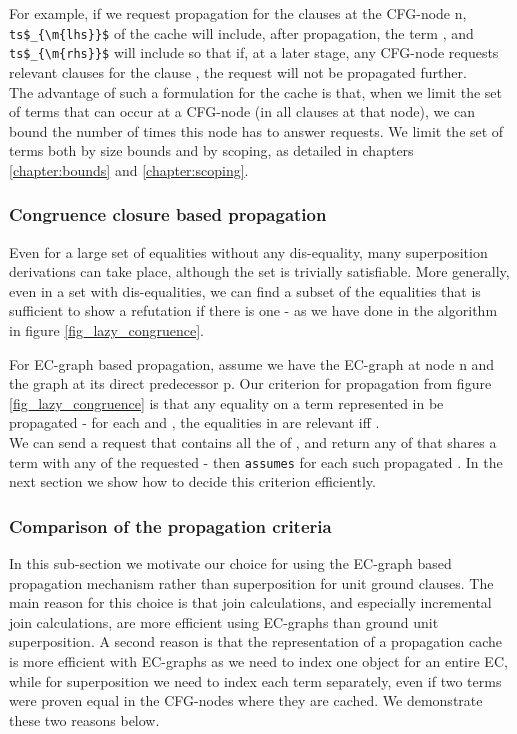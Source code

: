 For example, if we request propagation for the clauses  at the CFG-node n, \lstinline|ts$_{\m{lhs}}$| of the cache will include, after propagation, the term , and \lstinline|ts$_{\m{rhs}}$| will include  so that if, at a later stage, any CFG-node requests relevant clauses for the clause , the request will not be propagated further.\\
The advantage of such a formulation for the cache is that, when we limit the set of terms that can occur at a CFG-node (in all clauses at that node), we can bound the number of times this node has to answer requests. We limit the set of terms both by size bounds and by scoping, as detailed in chapters \ref{chapter:bounds} and \ref{chapter:scoping}.

\subsubsection*{Congruence closure based propagation}
Even for a large set of equalities without any dis-equality,
many superposition derivations can take place, although the set is trivially satisfiable.
More generally, even in a set with dis-equalities, we can find a subset of the equalities that is sufficient to show a refutation if there is one - as we have done in the algorithm in figure \ref{fig_lazy_congruence}.

\bigskip

\noindent
For EC-graph based propagation, assume we have the EC-graph  at node n and the graph  at its direct predecessor p.
Our criterion for propagation from figure \ref{fig_lazy_congruence} is that any equality on a term represented in  be propagated - for each \GT{}  and \GT{} , the equalities in  are relevant iff .\\
We can send a request that contains all the \GTs{} of , and return any \GT{} of  that shares a term with any of the requested \GTs{} -  then \lstinline|assumes|  for each such propagated \GT{}. In the next section we show how to decide this criterion efficiently.


\subsubsection*{Comparison of the propagation criteria}
In this sub-section we motivate our choice for using the EC-graph based propagation mechanism rather than superposition for unit ground clauses. The main reason for this choice is that join calculations, and especially incremental join calculations, are more efficient using EC-graphs than ground unit superposition. A second reason is that the representation of a propagation cache is more efficient with EC-graphs as we need to index one object for an entire EC, while for superposition we need to index each term separately, even if two terms were proven equal in the CFG-nodes where they are cached. We demonstrate these two reasons below.

